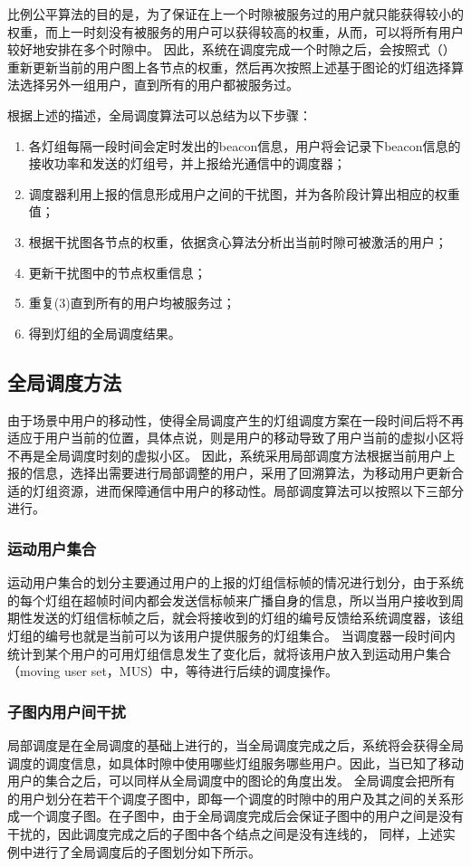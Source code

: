 比例公平算法的目的是，为了保证在上一个时隙被服务过的用户就只能获得较小的权重，而上一时刻没有被服务的用户可以获得较高的权重，从而，可以将所有用户较好地安排在多个时隙中。
因此，系统在调度完成一个时隙之后，会按照式（）重新更新当前的用户图上各节点的权重，然后再次按照上述基于图论的灯组选择算法选择另外一组用户，直到所有的用户都被服务过。

根据上述的描述，全局调度算法可以总结为以下步骤：

\begin{enumerate}
    \item 各灯组每隔一段时间会定时发出的beacon信息，用户将会记录下beacon信息的接收功率和发送的灯组号，并上报给光通信中的调度器；
    \item 调度器利用上报的信息形成用户之间的干扰图，并为各阶段计算出相应的权重值；
    \item 根据干扰图各节点的权重，依据贪心算法分析出当前时隙可被激活的用户；
    \item 更新干扰图中的节点权重信息；
    \item 重复(3)直到所有的用户均被服务过；
    \item 得到灯组的全局调度结果。
\end{enumerate}

\subsection{全局调度方法}
由于场景中用户的移动性，使得全局调度产生的灯组调度方案在一段时间后将不再适应于用户当前的位置，具体点说，则是用户的移动导致了用户当前的虚拟小区将不再是全局调度时刻的虚拟小区。
因此，系统采用局部调度方法根据当前用户上报的信息，选择出需要进行局部调整的用户，采用了回溯算法，为移动用户更新合适的灯组资源，进而保障通信中用户的移动性。局部调度算法可以按照以下三部分进行。

\subsubsection{运动用户集合}
运动用户集合的划分主要通过用户的上报的灯组信标帧的情况进行划分，由于系统的每个灯组在超帧时间内都会发送信标帧来广播自身的信息，所以当用户接收到周期性发送的灯组信标帧之后，就会将接收到的灯组的编号反馈给系统调度器，该组灯组的编号也就是当前可以为该用户提供服务的灯组集合。
当调度器一段时间内统计到某个用户的可用灯组信息发生了变化后，就将该用户放入到运动用户集合（moving user set，MUS）中，等待进行后续的调度操作。

\subsubsection{子图内用户间干扰}
局部调度是在全局调度的基础上进行的，当全局调度完成之后，系统将会获得全局调度的调度信息，如具体时隙中使用哪些灯组服务哪些用户。因此，当已知了移动用户的集合之后，可以同样从全局调度中的图论的角度出发。
全局调度会把所有的用户划分在若干个调度子图中，即每一个调度的时隙中的用户及其之间的关系形成一个调度子图。在子图中，由于全局调度完成后会保证子图中的用户之间是没有干扰的，因此调度完成之后的子图中各个结点之间是没有连线的，
同样，上述实例中进行了全局调度后的子图划分如下所示。

